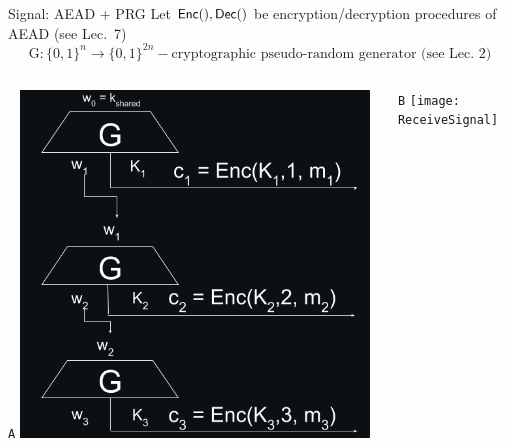 \documentclass[usenames,dvipsnames, 9pt]{beamer}
\begin{document}
\begin{frame}{Signal: AEAD + PRG}
	Let $\textsf{Enc}(),\textsf{Dec}()$ be encryption/decryption procedures of AEAD (see  Lec.\ 7)
	\[
		\text{G}: \{0,1\}^n \rightarrow \{0,1\}^{2n} - \text{cryptographic pseudo-random generator (see Lec. 2)}
	\]
	\vspace{10pt}
	\begin{columns}
		\begin{column}{0.5\textwidth}
			\centering
			{\LARGE \color{Orange}\texttt{A}}
			\includegraphics[width=0.95\textwidth]{SendSignal}
		\end{column}
		\begin{column}{0.5\textwidth}
			\centering
			{\LARGE \color{Orange}\texttt{B}}
			\pause 
			\texttt{[image: ReceiveSignal]}
		\end{column}
	\end{columns}
\end{frame}
\end{document}
